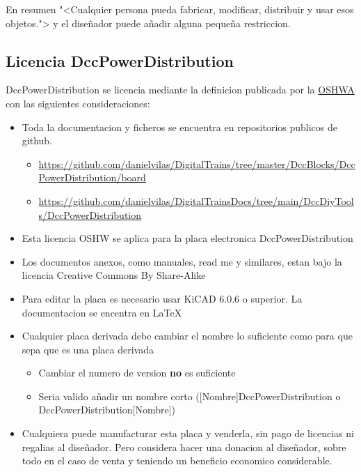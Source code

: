 En resumen "<Cualquier persona pueda fabricar, modificar, distribuir y usar esos objetos."> y el diseñador 
puede añadir alguna pequeña restriccion.

\subsection{Licencia DccPowerDistribution}
DccPowerDistribution se licencia mediante la definicion publicada por la \href{https://www.oshwa.org/definition/spanish/}{OSHWA}
con las siguientes consideraciones:
\begin{itemize}
    \item Toda la documentacion y ficheros se encuentra en repositorios publicos de github.
    \begin{itemize}
        \item \url{https://github.com/danielvilas/DigitalTrains/tree/master/DccBlocks/DccPowerDistribution/board}
        \item \url{https://github.com/danielvilas/DigitalTrainsDocs/tree/main/DccDiyTools/DccPowerDistribution} 
    \end{itemize}
    \item Esta licencia OSHW se aplica para la placa electronica DccPowerDistribution 
    \item Los documentos anexos, como manuales, read me y similares, estan bajo la licencia Creative Commons By Share-Alike 
    \ccbysa
    \item Para editar la placa es necesario usar KiCAD 6.0.6 o superior. La documentacion se encentra en \LaTeX
    \item Cualquier placa derivada debe cambiar el nombre lo suficiente como para que sepa que es una placa derivada
    \begin{itemize}
        \item Cambiar el numero de version \textbf{no} es suficiente
        \item Seria valido añadir un nombre corto ([Nombre]DccPowerDistribution o DccPowerDistribution[Nombre]) 
    \end{itemize}
    \item Cualquiera puede manufacturar esta placa y venderla, sin pago de licencias ni regalias al diseñador.
Pero considera hacer una donacion al diseñador, sobre todo en el caso de venta y teniendo un beneficio economico
considerable. 
\end{itemize}